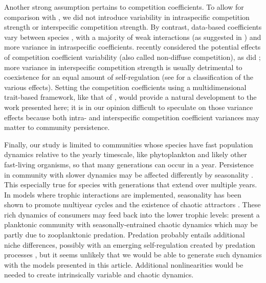 \documentclass[a4paper,12pt]{article}
\begin{document}
Another strong assumption pertains to competition coefficients. To
allow for comparison with \citet{scranton_coexistence_2016}, we did
not introduce variability in intraspecific competition strength or
interspecific competition strength. By contrast, data-based coefficients
vary between species \citep{barraquand2018coastal}, with a majority
of weak interactions (as suggested in \citealp{wootton_measurement_2005})
and more variance in intraspecific coefficients. \citet{stump_multispecies_2017}
recently considered the potential effects of competition coefficient
variability (also called non-diffuse competition), as did \citet{kokkoris_variability_2002};
more variance in interspecific competition strength is usually detrimental
to coexistence for an equal amount of self-regulation (see \citet{stump_multispecies_2017}
for a classification of the various effects). Setting the competition
coefficients using a multidimensional trait-based framework, like
that of \citet{ashby_competing_2017}, would provide a natural development
to the work presented here; it is in our opinion difficult to speculate
on those variance effects because both intra- and interspecific competition
coefficient variances may matter to community persistence.

Finally, our study is limited to communities whose species have fast
population dynamics relative to the yearly timescale, like phytoplankton
and likely other fast-living organisms, so that many generations can
occur in a year. Persistence in community with slower dynamics may
be affected differently by seasonality \citep{miller_evolutionary_2017}.
This especially true for species with generations that extend over
multiple years. In models where trophic interactions are implemented,
seasonality has been shown to promote multiyear cycles and the existence
of chaotic attractors \citep{rinaldi_multiple_1993,taylor_how_2013,tyson_seasonally_2016}.
These rich dynamics of consumers may feed back into the lower trophic
levels: \citet{dakos_interannual_2009} present a planktonic community
with seasonally-entrained chaotic dynamics which may be partly due
to zooplanktonic predation. Predation probably entails additional
niche differences, possibly with an emerging self-regulation created
by predation processes \citep{chesson_updates_2018}, but it seems
unlikely that we would be able to generate such dynamics with the
models presented in this article. Additional nonlinearities would
be needed to create intrinsically variable and chaotic dynamics.
\end{document}
